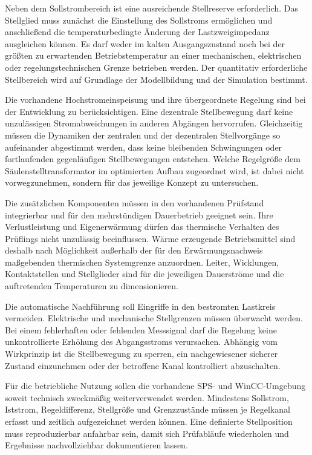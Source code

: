 Neben dem Sollstrombereich ist eine ausreichende Stellreserve erforderlich.
Das Stellglied muss zunächst die Einstellung des Sollstroms ermöglichen und
anschließend die temperaturbedingte Änderung der Lastzweigimpedanz
ausgleichen können. Es darf weder im kalten Ausgangszustand noch bei der
größten zu erwartenden Betriebstemperatur an einer mechanischen,
elektrischen oder regelungstechnischen Grenze betrieben werden. Der
quantitativ erforderliche Stellbereich wird auf Grundlage der Modellbildung
und der Simulation bestimmt.

Die vorhandene Hochstromeinspeisung und ihre übergeordnete Regelung sind bei
der Entwicklung zu berücksichtigen. Eine dezentrale Stellbewegung darf keine
unzulässigen Stromabweichungen in anderen Abgängen hervorrufen. Gleichzeitig
müssen die Dynamiken der zentralen und der dezentralen Stellvorgänge so
aufeinander abgestimmt werden, dass keine bleibenden Schwingungen oder
fortlaufenden gegenläufigen Stellbewegungen entstehen. Welche Regelgröße dem
Säulenstelltransformator im optimierten Aufbau zugeordnet wird, ist dabei
nicht vorwegzunehmen, sondern für das jeweilige Konzept zu untersuchen.

Die zusätzlichen Komponenten müssen in den vorhandenen Prüfstand integrierbar
und für den mehrstündigen Dauerbetrieb geeignet sein. Ihre Verlustleistung
und Eigenerwärmung dürfen das thermische Verhalten des Prüflings nicht
unzulässig beeinflussen. Wärme erzeugende Betriebsmittel sind deshalb nach
Möglichkeit außerhalb der für den Erwärmungsnachweis maßgebenden thermischen
Systemgrenze anzuordnen. Leiter, Wicklungen, Kontaktstellen und Stellglieder
sind für die jeweiligen Dauerströme und die auftretenden Temperaturen zu
dimensionieren.

Die automatische Nachführung soll Eingriffe in den bestromten Lastkreis
vermeiden. Elektrische und mechanische Stellgrenzen müssen überwacht werden.
Bei einem fehlerhaften oder fehlenden Messsignal darf die Regelung keine
unkontrollierte Erhöhung des Abgangsstroms verursachen. Abhängig vom
Wirkprinzip ist die Stellbewegung zu sperren, ein nachgewiesener sicherer
Zustand einzunehmen oder der betroffene Kanal kontrolliert abzuschalten.

Für die betriebliche Nutzung sollen die vorhandene SPS- und WinCC-Umgebung
soweit technisch zweckmäßig weiterverwendet werden. Mindestens Sollstrom,
Iststrom, Regeldifferenz, Stellgröße und Grenzzustände müssen je Regelkanal
erfasst und zeitlich aufgezeichnet werden können. Eine definierte
Stellposition muss reproduzierbar anfahrbar sein, damit sich Prüfabläufe
wiederholen und Ergebnisse nachvollziehbar dokumentieren lassen.

